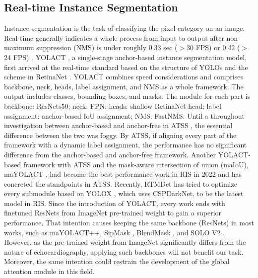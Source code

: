 \documentclass{article}
\begin{document}
\subsection{Real-time Instance Segmentation}
\label{sec2.2}
Instance segmentation is the task of classifying the pixel category on an image. Real-time generally indicates a whole process from input to output after non-maximum suppression (NMS) is under roughly 0.33 sec ($>$30 FPS) \cite{bolya2019yolact} or 0.42 ($>$24 FPS) \cite{oksuz2021mask}. YOLACT \cite{bolya2019yolact}, a single-stage anchor-based instance segmentation model, first arrived at the real-time standard based on the structure of YOLOs \cite{redmon2018yolov3}\cite{ge2021yolox} and the scheme in RetinaNet \cite{lin2017focal}. YOLACT combines speed considerations and comprises backbone, neck, heads, label assignment, and NMS as a whole framework. The output includes classes, bounding boxes, and masks. The module for each part is backbone: ResNets50; neck: FPN; heads: shallow RetinaNet head; label assignment: anchor-based IoU assignment; NMS: FastNMS. Until a throughout investigation between anchor-based and anchor-free in ATSS \cite{zhang2020bridging}, the essential difference between the two was foggy. By ATSS, if aligning every part of the framework with a dynamic label assignment, the performance has no significant difference from the anchor-based and anchor-free framework. Another YOLACT-based framework with ATSS and the mask-aware intersection of union (maIoU), maYOLACT \cite{oksuz2021mask}, had become the best performance work in RIS in 2022 and has concreted the standpoints in ATSS. Recently, RTMDet \cite{lyu2022rtmdet} has tried to optimize every submodule based on YOLOX \cite{ge2021yolox}, which uses CSPDarkNet, to be the latest model in RIS. Since the introduction of YOLACT, every work ends with finetuned ResNets from ImageNet pre-trained weight to gain a superior performance. That intention causes keeping the same backbone (ResNets) in most works, such as {ma}YOLACT{++}, SipMask \cite{cao2020sipmask}, BlendMask \cite{chen2020blendmask}, and SOLO V2 \cite{wang2020solov2}. However, as the pre-trained weight from ImageNet significantly differs from the nature of echocardiography, applying such backbones will not benefit our task. Moreover, the same intention could restrain the development of the global attention module in this field. 
\end{document}
